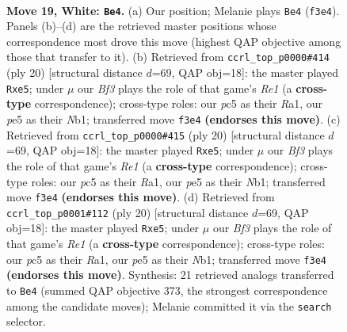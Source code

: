 \documentclass[11pt]{article}
\begin{document}
\clearpage

\begin{figure}[p]\centering
\begin{subfigure}{0.46\textwidth}\centering
\resizebox{\linewidth}{!}{%
\newchessgame
\chessboard[
  setfen={nrb2rk1/p3qpbp/8/1pp1pn1P/8/3PPB2/PP3P2/RNBQNRK1 w - - 4 19},
  showmover=false,
  pgfstyle=straightmove, color=movearrow, markmove={f3-e4}
]}
\caption{}
\end{subfigure}\hfill
\begin{subfigure}{0.46\textwidth}\centering
\resizebox{\linewidth}{!}{%
\newchessgame
\chessboard[
  setfen={r1bq1rk1/2p1bppp/p7/1p1nn3/8/1BP5/PP1P1PPP/RNBQR1K1 w - - 0 11},
  showmover=false,
  pgfstyle=straightmove, color=movearrow, markmove={e1-e5}
]}
\caption{}
\end{subfigure}
\\[4pt]
\begin{subfigure}{0.46\textwidth}\centering
\resizebox{\linewidth}{!}{%
\newchessgame
\chessboard[
  setfen={r1bq1rk1/2p1bppp/p7/1p1nn3/8/1BP5/PP1P1PPP/RNBQR1K1 w - - 0 11},
  showmover=false,
  pgfstyle=straightmove, color=movearrow, markmove={e1-e5}
]}
\caption{}
\end{subfigure}\hfill
\begin{subfigure}{0.46\textwidth}\centering
\resizebox{\linewidth}{!}{%
\newchessgame
\chessboard[
  setfen={r1bq1rk1/2p1bppp/p7/1p1nn3/8/1BP5/PP1P1PPP/RNBQR1K1 w - - 0 11},
  showmover=false,
  pgfstyle=straightmove, color=movearrow, markmove={e1-e5}
]}
\caption{}
\end{subfigure}
\caption{\textbf{Move 19, White: \texttt{Be4}.} (a) Our position; Melanie plays \texttt{Be4} (\texttt{f3e4}). Panels (b)--(d) are the retrieved master positions whose correspondence most drove this move (highest QAP objective among those that transfer to it). (b) Retrieved from \texttt{ccrl\_top\_p0000\#414} (ply 20) [structural distance $d$=69, QAP obj=18]: the master played \texttt{Rxe5}; under $\mu$ our \emph{Bf3} plays the role of that game's \emph{Re1} (a \textbf{cross-type} correspondence); cross-type roles: our \emph{p}c5 as their \emph{R}a1, our \emph{p}e5 as their \emph{N}b1; transferred move \texttt{f3e4} \textbf{(endorses this move)}. (c) Retrieved from \texttt{ccrl\_top\_p0000\#415} (ply 20) [structural distance $d$=69, QAP obj=18]: the master played \texttt{Rxe5}; under $\mu$ our \emph{Bf3} plays the role of that game's \emph{Re1} (a \textbf{cross-type} correspondence); cross-type roles: our \emph{p}c5 as their \emph{R}a1, our \emph{p}e5 as their \emph{N}b1; transferred move \texttt{f3e4} \textbf{(endorses this move)}. (d) Retrieved from \texttt{ccrl\_top\_p0001\#112} (ply 20) [structural distance $d$=69, QAP obj=18]: the master played \texttt{Rxe5}; under $\mu$ our \emph{Bf3} plays the role of that game's \emph{Re1} (a \textbf{cross-type} correspondence); cross-type roles: our \emph{p}c5 as their \emph{R}a1, our \emph{p}e5 as their \emph{N}b1; transferred move \texttt{f3e4} \textbf{(endorses this move)}. Synthesis: 21 retrieved analogs transferred to \texttt{Be4} (summed QAP objective 373, the strongest correspondence among the candidate moves); Melanie committed it via the \texttt{search} selector.}
\label{fig:thought-m36}
\end{figure}
\end{document}
